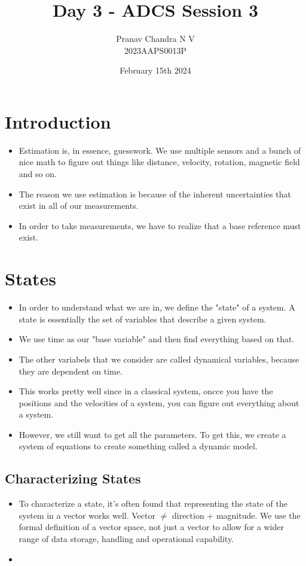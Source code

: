 \documentclass[a4paper, 11pt]{article}
\title{Day 3 - ADCS Session 3} %
\date{February 15th 2024} %
\author{Pranav Chandra N V\\2023AAPS0013P} %
\begin{document}
	\maketitle
	\newpage
	\tableofcontents
	\newpage
	
	\section{Introduction}
	\begin{itemize}
		\item Estimation is, in essence, guesswork. We use multiple sensors and a bunch of nice math to figure out things like distance, velocity, rotation, magnetic field and so on.
		\item The reason we use estimation is because of the inherent uncertainties that exist in all of our measurements.
		\item In order to take measurements, we have to realize that a base reference must exist.
	\end{itemize}
	\section{States}
	\begin{itemize}
		\item In order to understand what we are in, we define the "state" of a system. A state is essentially the set of variables that describe a given system.
		\item We use time as our "base variable" and then find everything based on that.
		\item The other variabels that we consider are called dynamical variables, because they are dependent on time.
		\item This works pretty well since in a classical system, oncce you have the positions and the velocities of a system, you can figure out everything about a system.
		\item However, we still want to get all the parameters. To get this, we create a system of equations to create something called a dynamic model.
	\end{itemize}
		
	\subsection{Characterizing States}
	\begin{itemize}
			\item To characterize a state, it's often found that representing the state of the system in a vector works well.
			\subitem Vector $\neq$ direction + magnitude. We use the formal definition of a vector space, not just a vector to allow for a wider range of data storage, handling and operational capability.
			\item 
	\end{itemize}
		
\end{document}
